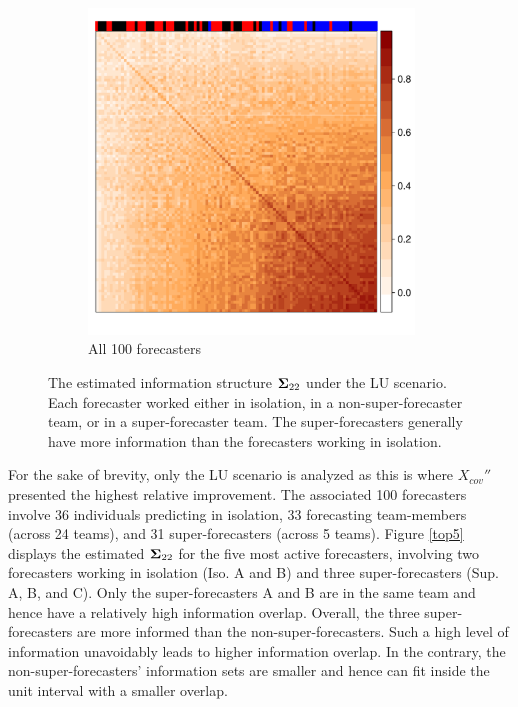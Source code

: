 \documentclass[11pt]{article}
\theoremstyle{definition}
\theoremstyle{definition}
\def\bSigma{{\bf \Sigma}}
\begin{document}
\begin{figure}[t!]
\begin{subfigure}[b]{0.495\textwidth}
                \includegraphics[width=0.95\textwidth]{rightInfoPlot.pdf}
            \caption{All 100 forecasters}
                                \label{top100}
        \end{subfigure}

       
        \caption{The estimated information structure $\bSigma_{22}$ under the LU scenario. Each forecaster worked either in isolation, in a non-super-forecaster team, or in a super-forecaster team. The super-forecasters generally have more information than the forecasters working in isolation.}
        \label{SynthPlot}
\end{figure}


For the sake of brevity, only the LU scenario is analyzed as this is where $X_{cov}''$ presented the highest relative improvement. 
The associated 100 forecasters involve 36 individuals predicting in isolation, 33 forecasting team-members (across 24 teams), and 31 super-forecasters (across 5 teams).  Figure \ref{top5} displays the estimated $\bSigma_{22}$ for the five most active forecasters, involving two forecasters working in isolation (Iso. A and B) and three super-forecasters (Sup. A, B, and C). Only the super-forecasters A and B are in the same team and hence have a relatively high information overlap. Overall, the three super-forecasters are more informed than the non-super-forecasters. Such a high level of information unavoidably leads to higher information overlap. In the contrary, the non-super-forecasters' information sets are smaller and hence  can fit inside the unit interval with a smaller overlap. 
\end{document}
